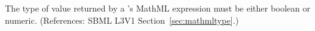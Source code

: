 The type of value returned by a \FunctionDefinition's  MathML
expression must be either boolean or numeric.  (References: SBML L3V1
Section~\ref{sec:mathmltype}.)
